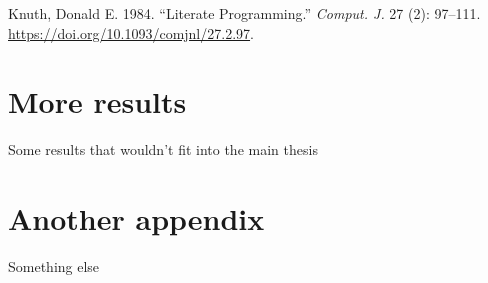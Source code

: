 \documentclass[
  12pt,
  letterpaper,
  oneside,
  open=any]{scrbook}
\newlength{\cslhangindent}
\newlength{\cslentryspacingunit} %
\newenvironment{CSLReferences}[2] %
 {%
  \setlength{\parindent}{0pt}
  \ifodd #1
  \let\oldpar\par
  \def\par{\hangindent=\cslhangindent\oldpar}
  \fi
  \setlength{\parskip}{#2\cslentryspacingunit}
 }%
 {}
\begin{document}
\hypertarget{refs}{}
\begin{CSLReferences}{1}{0}
\leavevmode{}%
Knuth, Donald E. 1984. {``Literate Programming.''} \emph{Comput. J.} 27
(2): 97--111. \url{https://doi.org/10.1093/comjnl/27.2.97}.

\end{CSLReferences}

\cleardoublepage
{}
{}
\appendix

\hypertarget{sec-more-results}{%
\chapter{More results}\label{sec-more-results}}

Some results that wouldn't fit into the main thesis

\hypertarget{another-appendix}{%
\chapter{Another appendix}\label{another-appendix}}

Something else


\backmatter
\end{document}
